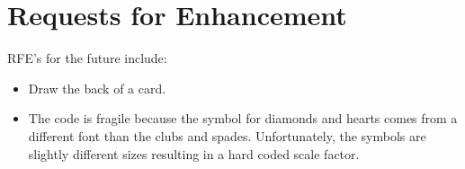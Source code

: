 \documentclass[11pt]{article}
\begin{document}
\section{Requests for Enhancement}

RFE's for the future include:

\begin{itemize}
\item Draw the back of a card.

\item The code is fragile because the symbol for diamonds and hearts
  comes from a different font than the clubs and spades.  Unfortunately,
  the symbols are slightly different sizes resulting in a hard coded
  scale factor.
\end{itemize}  

\CardAceSpades[0.3]
\CardTwoSpades[0.3]
\CardThreeSpades[0.3]
\CardFourSpades[0.3]
\CardFiveSpades[0.3]
\CardSixSpades[0.3]
\CardSevenSpades[0.3]
\CardEightSpades[0.3]
\CardNineSpades[0.3]
\CardTenSpades[0.3]
\CardJackSpades[0.3]
\CardQueenSpades[0.3]
\CardKingSpades[0.3]

\CardAceHearts[0.3]
\CardTwoHearts[0.3]
\CardThreeHearts[0.3]
\CardFourHearts[0.3]
\CardFiveHearts[0.3]
\CardSixHearts[0.3]
\CardSevenHearts[0.3]
\CardEightHearts[0.3]
\CardNineHearts[0.3]
\CardTenHearts[0.3]
\CardJackHearts[0.3]
\CardQueenHearts[0.3]
\CardKingHearts[0.3]

\CardAceDiamonds[0.3]
\CardTwoDiamonds[0.3]
\CardThreeDiamonds[0.3]
\CardFourDiamonds[0.3]
\CardFiveDiamonds[0.3]
\CardSixDiamonds[0.3]
\CardSevenDiamonds[0.3]
\CardEightDiamonds[0.3]
\CardNineDiamonds[0.3]
\CardTenDiamonds[0.3]
\CardJackDiamonds[0.3]
\CardQueenDiamonds[0.3]
\CardKingDiamonds[0.3]

\CardAceClubs[0.3]
\CardTwoClubs[0.3]
\CardThreeClubs[0.3]
\CardFourClubs[0.3]
\CardFiveClubs[0.3]
\CardSixClubs[0.3]
\CardSevenClubs[0.3]
\CardEightClubs[0.3]
\CardNineClubs[0.3]
\CardTenClubs[0.3]
\CardJackClubs[0.3]
\CardQueenClubs[0.3]
\CardKingClubs[0.3]
\end{document}
